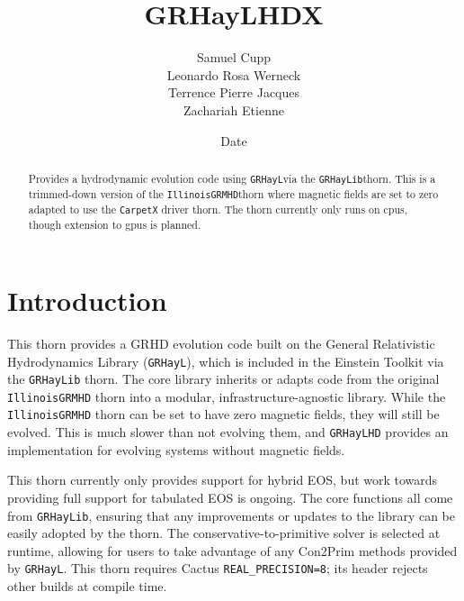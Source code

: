 \documentclass{article}
\begin{document}
\title{GRHayLHDX}
\author{Samuel Cupp \\ Leonardo Rosa Werneck \\ Terrence Pierre Jacques \\ Zachariah Etienne}
\date{$ $Date$ $}

\maketitle


\newcommand{\grhayl}{\texttt{GRHayL}}
\newcommand{\glib}{\texttt{GRHayLib}}
\newcommand{\ghd}{\texttt{GRHayLHD}}
\newcommand{\ghdx}{\texttt{GRHayLHDX}}
\newcommand{\igm}{\texttt{IllinoisGRMHD}}
\newcommand{\hydrobase}{\texttt{HydroBase}}

\begin{abstract}
Provides a hydrodynamic evolution code using \grhayl via the
\glib thorn. This is a trimmed-down version of the \igm thorn
where magnetic fields are set to zero adapted to use the
\texttt{CarpetX} driver thorn. The thorn currently only
runs on cpus, though extension to gpus is planned.
\end{abstract}

\section{Introduction}

This thorn provides a GRHD evolution code built on
the General Relativistic Hydrodynamics Library (\grhayl),
which is included in the Einstein Toolkit via the \glib{}
thorn. The core library inherits or adapts code from the
original \igm{} thorn into a modular, infrastructure-agnostic
library. While the \igm{} thorn can be set to have
zero magnetic fields, they will still be evolved. This
is much slower than not evolving them, and \ghd{} provides an
implementation for evolving systems without magnetic
fields.

This thorn currently only provides support for hybrid EOS, but
work towards providing full support for tabulated EOS is ongoing.
The core functions all come from \glib,
ensuring that any improvements or updates to the library can
be easily adopted by the thorn. The conservative-to-primitive
solver is selected at runtime, allowing for users to take
advantage of any Con2Prim methods provided by \grhayl.
This thorn requires Cactus \texttt{REAL\_PRECISION=8}; its header rejects
other builds at compile time.
\end{document}
